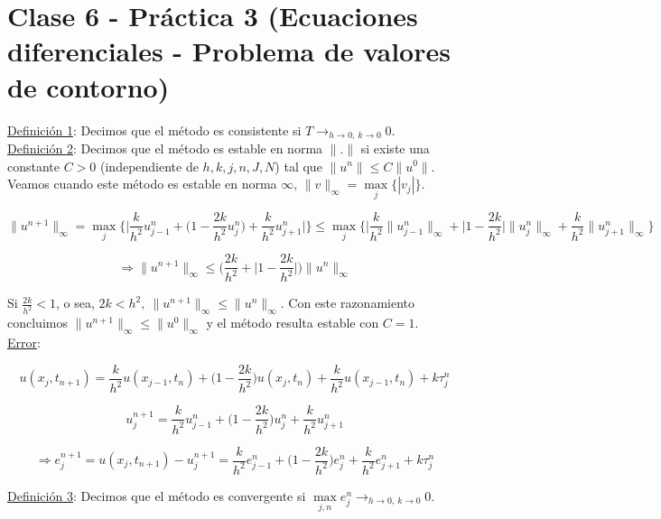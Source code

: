 \section{Clase 6 - Pr\'actica 3 (Ecuaciones diferenciales - Problema de valores de contorno)}

\underline{Definici\'on 1}: Decimos que el m\'etodo es consistente si $T \rightarrow_{h \rightarrow 0,\ k \rightarrow 0} 0$.\\

\underline{Definici\'on 2}: Decimos que el m\'etodo es estable en norma $\|.\|$ si existe una constante $C > 0$ (independiente de $h, k, j, n, J, N$) tal que $\|u^{n}\| \leq C\|u^{0}\|$.\\

Veamos cuando este m\'etodo es estable en norma $\infty$, $\|v\|_{\infty} = \max \limits_{j} \{|v_{j}|\}$.

$$\|u^{n + 1}\|_{\infty} = \max \limits_{j} \bigg\{\bigg| \frac{k}{h^{2}}u_{j - 1}^{n} + \bigg(1 - \frac{2k}{h^{2}}u_{j}^{n}\bigg) +  \frac{k}{h^{2}}u_{j + 1}^{n} \bigg| \bigg\} \leq \max \limits_{j} \bigg\{\bigg| \frac{k}{h^{2}}\|u_{j - 1}^{n}\|_{\infty} + \bigg|1 - \frac{2k}{h^{2}}\bigg|\|u_{j}^{n}\|_{\infty} +  \frac{k}{h^{2}}\|u_{j + 1}^{n}\|_{\infty} \bigg\}$$

$$\Rightarrow \|u^{n + 1}\|_{\infty} \leq \bigg(\frac{2k}{h^{2}} +   \bigg|1 - \frac{2k}{h^{2}}\bigg|\bigg)\|u^{n}\|_{\infty}$$

Si $\frac{2k}{h^{2}} < 1$, o sea, $2k < h^{2},\ \|u^{n + 1}\|_{\infty} \leq \|u^{n}\|_{\infty}$. Con este razonamiento concluimos $\|u^{n + 1}\|_{\infty} \leq \|u^{0}\|_{\infty}$ y el m\'etodo resulta estable con $C = 1$.\\

\underline{Error}:

$$u(x_{j}, t_{n + 1}) = \frac{k}{h^{2}}u(x_{j - 1}, t_{n}) + \bigg(1 - \frac{2k}{h^{2}}\bigg)u(x_{j}, t_{n}) + \frac{k}{h^{2}}u(x_{j - 1}, t_{n})+ k\tau_{j}^{n}$$

$$u_{j}^{n + 1} = \frac{k}{h^{2}}u_{j - 1}^{n} + \bigg(1 - \frac{2k}{h^{2}}\bigg)u_{j}^{n} + \frac{k}{h^{2}}u_{j + 1}^{n}$$

$$\Rightarrow e_{j}^{n + 1} = u(x_{j}, t_{n + 1}) - u_{j}^{n + 1} = \frac{k}{h^{2}}e_{j - 1}^{n} + \bigg(1 - \frac{2k}{h^{2}}\bigg)e_{j}^{n} + \frac{k}{h^{2}}e_{j + 1}^{n} + k\tau_{j}^{n}$$

\underline{Definici\'on 3}: Decimos que el m\'etodo es convergente si $\max \limits_{j, n} e_{j}^{n} \rightarrow_{h \rightarrow 0,\ k \rightarrow 0} 0$.\\

